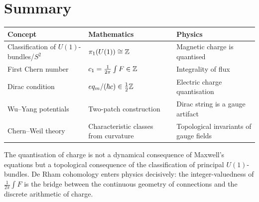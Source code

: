 \section{Summary}

\begin{table}[h]
\centering
\renewcommand{\arraystretch}{1.4}
\begin{tabular}{lll}
\toprule
\textbf{Concept} & \textbf{Mathematics} & \textbf{Physics} \\
\midrule
Classification of $U(1)$-bundles/$S^2$ & $\pi_1(U(1)) \cong \mathbb{Z}$ & Magnetic charge is quantised \\
First Chern number & $c_1 = \frac{1}{2\pi}\int F \in \mathbb{Z}$ & Integrality of flux \\
Dirac condition & $eq_m/(\hbar c) \in \tfrac{1}{2}\mathbb{Z}$ & Electric charge quantisation \\
Wu--Yang potentials & Two-patch construction & Dirac string is a gauge artifact \\
Chern--Weil theory & Characteristic classes from curvature & Topological invariants of gauge fields \\
\bottomrule
\end{tabular}
\end{table}

The quantisation of charge is not a dynamical consequence of Maxwell's equations but a topological consequence of the classification of principal $U(1)$-bundles. De Rham cohomology enters physics decisively: the integer-valuedness of $\frac{1}{2\pi}\int F$ is the bridge between the continuous geometry of connections and the discrete arithmetic of charge.
